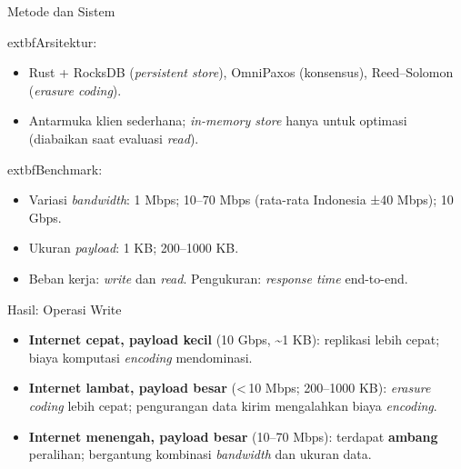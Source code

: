 \documentclass[a2,portrait]{config/poster/a0poster}
\newcommand{\postersection}[1]{%
	\begin{tcolorbox}[
		colback=ITBblue,
		colframe=ITBblue,
		fonttitle=\bfseries,
		coltext=white,
		sharp corners,
		boxrule=0pt,
		top=0pt,
		bottom=0pt,
		halign=center
	]
	\normalsize #1
	\end{tcolorbox}%
}
\begin{document}
\begin{multicols}{2}

\postersection{Metode dan Sistem}
	extbf{Arsitektur:}
\begin{itemize}[leftmargin=*, itemsep=2pt]
	\item Rust + RocksDB (\textit{persistent store}), OmniPaxos (konsensus), Reed–Solomon (\textit{erasure coding}).
	\item Antarmuka klien sederhana; \textit{in-memory store} hanya untuk optimasi (diabaikan saat evaluasi \textit{read}).
\end{itemize}
		extbf{Benchmark:}
\begin{itemize}[leftmargin=*, itemsep=2pt]
	\item Variasi \textit{bandwidth}: 1 Mbps; 10–70 Mbps (rata-rata Indonesia ±40 Mbps); 10 Gbps.
	\item Ukuran \textit{payload}: 1 KB; 200–1000 KB.
	\item Beban kerja: \textit{write} dan \textit{read}. Pengukuran: \textit{response time} end-to-end.
\end{itemize}


\postersection{Hasil: Operasi Write}
\begin{itemize}[leftmargin=*, itemsep=2pt]
	\item \textbf{Internet cepat, payload kecil} (10 Gbps, \textasciitilde1 KB): replikasi lebih cepat; biaya komputasi \textit{encoding} mendominasi.
	\item \textbf{Internet lambat, payload besar} (\textless{}\,10 Mbps; 200–1000 KB): \textit{erasure coding} lebih cepat; pengurangan data kirim mengalahkan biaya \textit{encoding}.
	\item \textbf{Internet menengah, payload besar} (10–70 Mbps): terdapat \textbf{ambang} peralihan; bergantung kombinasi \textit{bandwidth} dan ukuran data.
\end{itemize}



\end{multicols}
\end{document}
